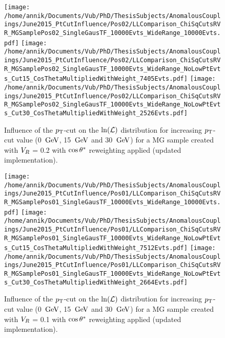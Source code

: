 \begin{figure}[h!t]
 \centering
 \texttt{[image: /home/annik/Documents/Vub/PhD/ThesisSubjects/AnomalousCouplings/June2015\_PtCutInfluence/Pos02/LLComparison\_ChiSqCutsRVR\_MGSamplePos02\_SingleGausTF\_10000Evts\_WideRange\_10000Evts.pdf]}
 \texttt{[image: /home/annik/Documents/Vub/PhD/ThesisSubjects/AnomalousCouplings/June2015\_PtCutInfluence/Pos02/LLComparison\_ChiSqCutsRVR\_MGSamplePos02\_SingleGausTF\_10000Evts\_WideRange\_NoLowPtEvts\_Cut15\_CosThetaMultipliedWithWeight\_7405Evts.pdf]}
 \texttt{[image: /home/annik/Documents/Vub/PhD/ThesisSubjects/AnomalousCouplings/June2015\_PtCutInfluence/Pos02/LLComparison\_ChiSqCutsRVR\_MGSamplePos02\_SingleGausTF\_10000Evts\_WideRange\_NoLowPtEvts\_Cut30\_CosThetaMultipliedWithWeight\_2526Evts.pdf]}
 \caption{Influence of the $p_{\textrm T}$-cut on the $\ln(\mathcal{L})$ distribution for increasing $p_{\textrm T}$-cut value (0 $\, \mathrm{GeV}$, 15 $\, \mathrm{GeV}$ and 30 $\, \mathrm{GeV}$) for a MG sample created with $V_{R}$ = 0.2 with $\cos \theta^{*}$ reweighting applied (updated implementation).}
 \label{fig::CosThetaPos02Update}
\end{figure}

\begin{figure}[h!t]
 \centering
 \texttt{[image: /home/annik/Documents/Vub/PhD/ThesisSubjects/AnomalousCouplings/June2015\_PtCutInfluence/Pos01/LLComparison\_ChiSqCutsRVR\_MGSamplePos01\_SingleGausTF\_10000Evts\_WideRange\_10000Evts.pdf]}
 \texttt{[image: /home/annik/Documents/Vub/PhD/ThesisSubjects/AnomalousCouplings/June2015\_PtCutInfluence/Pos01/LLComparison\_ChiSqCutsRVR\_MGSamplePos01\_SingleGausTF\_10000Evts\_WideRange\_NoLowPtEvts\_Cut15\_CosThetaMultipliedWithWeight\_7512Evts.pdf]}
 \texttt{[image: /home/annik/Documents/Vub/PhD/ThesisSubjects/AnomalousCouplings/June2015\_PtCutInfluence/Pos01/LLComparison\_ChiSqCutsRVR\_MGSamplePos01\_SingleGausTF\_10000Evts\_WideRange\_NoLowPtEvts\_Cut30\_CosThetaMultipliedWithWeight\_2664Evts.pdf]}
 \caption{Influence of the $p_{\textrm T}$-cut on the $\ln(\mathcal{L})$ distribution for increasing $p_{\textrm T}$-cut value (0 $\, \mathrm{GeV}$, 15 $\, \mathrm{GeV}$ and 30 $\, \mathrm{GeV}$) for a MG sample created with $V_{R}$ = 0.1 with $\cos \theta^{*}$ reweighting applied (updated implementation).}
 \label{fig::CosThetaPos01Update}
\end{figure}

